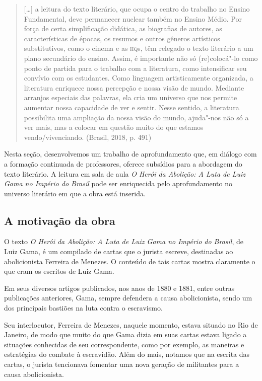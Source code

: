 \documentclass[12pt]{extarticle}
\begin{document}
\begin{quote}
{[}\ldots{}{]} a leitura do texto literário, que ocupa o centro do trabalho
no Ensino Fundamental, deve permanecer nuclear também no Ensino Médio.
Por força de certa simplificação didática, as biografias de autores, as
características de épocas, os resumos e outros gêneros artísticos
substitutivos, como o cinema e as \textsc{hq}s, têm relegado o texto literário a
um plano secundário do ensino. Assim, é importante não só (re)colocá"-lo
como ponto de partida para o trabalho com a literatura, como
intensificar seu convívio com os estudantes. Como linguagem
artisticamente organizada, a literatura enriquece nossa percepção e
nossa visão de mundo. Mediante arranjos especiais das palavras, ela cria
um universo que nos permite aumentar nossa capacidade de ver e sentir.
Nesse sentido, a literatura possibilita uma ampliação da nossa visão do
mundo, ajuda"-nos não só a ver mais, mas a colocar em questão muito do
que estamos vendo/vivenciando. (Brasil, 2018, p. 491)
\end{quote}

Nesta seção, desenvolvemos um trabalho de aprofundamento que, em diálogo
com a formação continuada de professores, oferece subsídios para a
abordagem do texto literário. A leitura em sala de aula \emph{O Herói da
Abolição: A Luta de Luiz Gama no Império do Brasil} pode ser enriquecida
pelo aprofundamento no universo literário em que a obra está inserida.

\subsection{A motivação da obra}

O texto \emph{O Herói da Abolição: A Luta de Luiz Gama no Império do
Brasil}, de Luiz Gama, é um compilado de cartas que o jurista escreve,
destinadas ao abolicionista Ferreira de Menezes. O conteúdo de tais
cartas mostra claramente o que eram os escritos de Luiz Gama.

Em seus diversos artigos publicados, nos anos de 1880 e 1881, entre
outras publicações anteriores, Gama, sempre defendera a causa
abolicionista, sendo um dos principais bastiões na luta contra o
escravismo.

Seu interlocutor, Ferreira de Menezes, naquele momento, estava situado
no Rio de Janeiro, de modo que muito do que Gama dizia em suas cartas
estava ligado a situações conhecidas de seu correspondente, como por
exemplo, as maneiras e estratégias do combate à escravidão. Além do
mais, notamos que na escrita das cartas, o jurista tencionava fomentar
uma nova geração de militantes para a causa abolicionista.
\end{document}
